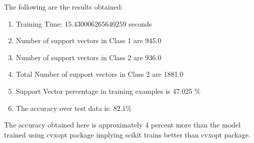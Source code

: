 \documentclass[11pt]{article}
\begin{document}
The following are the results obtained:
\begin{enumerate}
  \item Training Time:  $15.430006265640259$ seconds
  \item Number of support vectors in Class 1 are  945.0
  \item Number of support vectors in Class 2 are  936.0
  \item Total Number of support vectors in Class 2 are  1881.0
  \item Support Vector percentage in training examples is  47.025 $\%$
  \item The accuracy over test data is:  $82.1 \%$
\end{enumerate}

The accuracy obtained here is approximately 4 percent more than the model trained using cvxopt package implying scikit trains better than cvxopt package.
\\
\\
\end{document}
